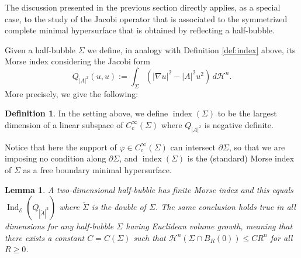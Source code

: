 \documentclass[JEP,XML,SOM,Unicode]{cedram}
\let\mathcal\mathscr
\newcounter{cas}
\DeclareMathOperator{\indx}{index}
\DeclareMathOperator{\Ind}{Ind}
\newtheorem{lem}[thm]{Lemma}
\theoremstyle{definition}
\newtheorem{definition}[thm]{Definition}
\newcommand{\h}{\mathscr{H}}
\begin{document}
The discussion presented in the previous section directly applies, as a special case, to the study of the Jacobi operator
that is associated to the symmetrized complete minimal hypersurface that is obtained by reflecting a half-bubble.

Given a half-bubble $\Sigma$ we define, in analogy with Definition \ref{def:index} above, its Morse index considering the Jacobi form
\[
Q_{|A|^2}(u,u):=\int_{\Sigma}(|\nabla u|^2-|A|^2u^2)\,d\h^n.
\]
More precisely, we give the following:

\begin{definition} In the setting above, we define
$\indx(\Sigma)$ to be the largest dimension of a linear subspace of $C^{\infty}_c(\Sigma)$ where $Q_{|A|^2}$ is negative definite.
\end{definition}
\noindent Notice that here the support of $\varphi\in C^{\infty}_c(\Sigma)$ can intersect $\partial\Sigma$, so that we are imposing no condition along $\partial\Sigma$, and $\indx(\Sigma)$ is the (standard) Morse index of $\Sigma$ as a free boundary minimal hypersurface.

\begin{lem}\label{lem:II1}
A two-dimensional half-bubble has finite Morse index and this equals $\Ind_{\mathcal{E}}(Q_{|\check{A}|^2})$ where $\check{\Sigma}$ is the double of $\Sigma$.
The same conclusion holds true in all dimensions for any half-bubble $\Sigma$ having Euclidean volume growth, meaning that there exists a constant $C=C(\Sigma)$ such that $\h^n(\Sigma\cap B_R(0))\leq C R^n$ for all $R\geq 0$.
\end{lem}
\end{document}
